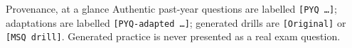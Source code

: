 \documentclass[11pt,a4paper,oneside]{report}
\begin{document}
\vspace{0.7em}
\begin{goldbox}{Provenance, at a glance}
Authentic past-year questions are labelled \texttt{[PYQ~\ldots]}; adaptations are
labelled \texttt{[PYQ-adapted~\ldots]}; generated drills are \texttt{[Original]} or
\texttt{[MSQ drill]}. Generated practice is never presented as a real exam question.
\end{goldbox}

\clearpage

\clearpage

\begingroup
\setlength{\parskip}{0pt}
\tableofcontents
\endgroup
\clearpage



\end{document}

